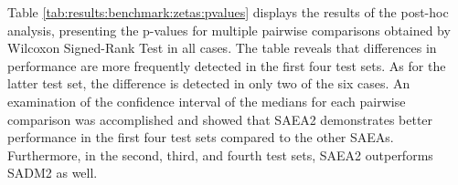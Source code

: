 			Table \ref{tab:results:benchmark:zetas:pvalues} displays the results of the post-hoc analysis, presenting the p-values for multiple pairwise comparisons obtained by Wilcoxon Signed-Rank Test in all cases. The table reveals that differences in performance are more frequently detected in the first four test sets. As for the latter test set, the difference is detected in only two of the six cases. An examination of the confidence interval of the medians for each pairwise comparison was accomplished and showed that SAEA2 demonstrates better performance in the first four test sets compared to the other SAEAs. Furthermore, in the second, third, and fourth test sets, SAEA2 outperforms SADM2 as well.
		
			\begin{figure}
				\centering
				 \hspace{0.02\textwidth}
				 \\
				 \hspace{0.02\textwidth}
				 \\

\end{figure}
